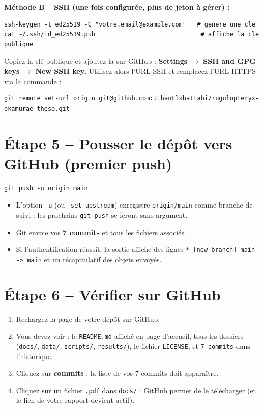 \documentclass[11pt,a4paper]{article}
\begin{document}
\textbf{Méthode B -- SSH (une fois configurée, plus de jeton à gérer) :}
\begin{lstlisting}
ssh-keygen -t ed25519 -C "votre.email@example.com"   # genere une cle
cat ~/.ssh/id_ed25519.pub                             # affiche la cle publique
\end{lstlisting}
Copiez la clé publique et ajoutez-la sur GitHub : \textbf{Settings}
$\rightarrow$ \textbf{SSH and GPG keys} $\rightarrow$ \textbf{New SSH key}. Utilisez
alors l'URL SSH et remplacez l'URL HTTPS via la commande :
\begin{lstlisting}
git remote set-url origin git@github.com:JihanElkhattabi/rugulopteryx-okamurae-these.git
\end{lstlisting}

\section{Étape 5 -- Pousser le dépôt vers GitHub (premier push)}
\begin{lstlisting}
git push -u origin main
\end{lstlisting}

\begin{itemize}
  \item L'option \texttt{-u} (ou \texttt{--set-upstream}) enregistre \texttt{origin/main}
        comme branche de suivi : les prochains \texttt{git push} se feront sans argument.
  \item Git envoie vos \textbf{7 commits} et tous les fichiers associés.
  \item Si l'authentification réussit, la sortie affiche des lignes
        \texttt{* [new branch] main -> main} et un récapitulatif des objets envoyés.
\end{itemize}

\section{Étape 6 -- Vérifier sur GitHub}
\begin{enumerate}
  \item Rechargez la page de votre dépôt sur GitHub.
  \item Vous devez voir : le \texttt{README.md} affiché en page d'accueil, tous les
        dossiers (\texttt{docs/}, \texttt{data/}, \texttt{scripts/}, \texttt{results/}),
        le fichier \texttt{LICENSE}, et \texttt{7 commits} dans l'historique.
  \item Cliquez sur \textbf{commits} : la liste de vos 7 commits doit apparaître.
  \item Cliquez sur un fichier \texttt{.pdf} dans \texttt{docs/} : GitHub permet de le
       télécharger (et le lien de votre rapport devient actif).
\end{enumerate}
\end{document}
